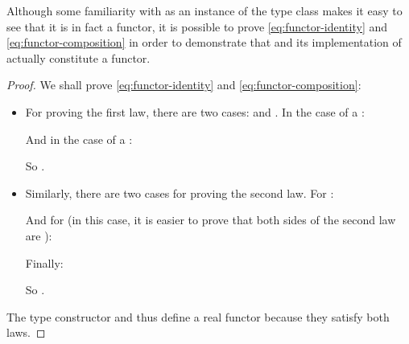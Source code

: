 \begin{example}
Although some familiarity with  as an instance of the
 type class makes it easy to see that it is in fact a
functor, it is possible to prove \eqref{eq:functor-identity} and
\eqref{eq:functor-composition} in order to demonstrate that  and
its implementation of  actually constitute a functor.

  \begin{proof}

    We shall prove \eqref{eq:functor-identity} and \eqref{eq:functor-composition}:
    \begin{itemize}
    \item
      For proving the first law, there are two cases: 
      and . In the case of a :
      \begin{steps}
      \end{steps}
      And in the case of a :
      \begin{steps}
      \end{steps}
      So .
    \item
      Similarly, there are two cases for proving the second law. For
      :
      \begin{steps}
      \end{steps}
      And for  (in this case, it is easier to prove that
      both sides of the second law are ):
      \begin{steps}
      \end{steps}
      Finally:
      \begin{steps}
      \end{steps}
      So .
    \end{itemize}
    The  type constructor and  thus
    define a real functor because they satisfy both laws.

  \end{proof}

\end{example}

